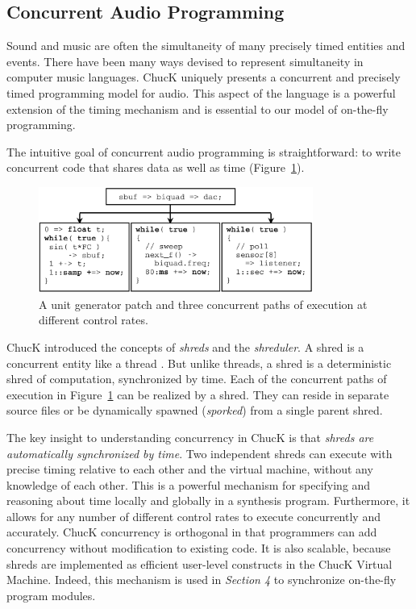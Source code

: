 \subsection{Concurrent Audio Programming}

Sound and music are often the simultaneity of many precisely timed entities and
events.  There have been many ways devised to represent simultaneity \cite{Dannenberg:1997,Loy:1985,Pope:1993} in
computer music languages.  ChucK uniquely presents a concurrent and precisely
timed programming model for audio.  This aspect of the language is a powerful
extension of the timing mechanism and is essential to our model of on-the-fly
programming.

The intuitive goal of concurrent audio programming is straightforward: to write
concurrent code that shares data as well as time (Figure~\ref{Wang:img-4}).



\begin{figure}[t]
\centering
\includegraphics[width=90mm]{fig4.png}
\caption{A unit generator patch and three concurrent paths of execution at different control rates.}
\label{Wang:img-4}
\end{figure}



ChucK introduced the concepts of \textit{shreds} and the \textit{shreduler}.  A
shred is a concurrent entity like a thread \cite{Birrell:1989}.  But unlike threads, a shred is a
deterministic shred of computation, synchronized by time.  Each of the concurrent
paths of execution in Figure~\ref{Wang:img-4} can be realized by a shred.  They can reside in
separate source files or be dynamically spawned (\textit{sporked}) from a single
parent shred.

The key insight to understanding concurrency in ChucK is that \textit{shreds are
automatically synchronized by time}. Two independent shreds can execute with
precise timing relative to each other and the virtual machine, without any
knowledge of each other.  This is a powerful mechanism for specifying and
reasoning about time locally and globally in a synthesis program.  Furthermore,
it allows for any number of different control rates to execute concurrently and
accurately.  ChucK concurrency is orthogonal in that programmers can add
concurrency without modification to existing code.  It is also scalable, because
shreds are implemented as efficient user-level constructs in the ChucK Virtual
Machine.  Indeed, this mechanism is used in \textit{Section 4} to synchronize
on-the-fly program modules.

